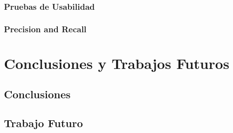 \documentclass[12pt,letterpaper,openany]{book}
\begin{document}
\subsection{Pruebas de Usabilidad}


\subsection{Precision and Recall}



\chapter{Conclusiones y Trabajos Futuros}\label{cap.conclu_trabajos}
\section{Conclusiones}
\section{Trabajo Futuro}


\end{document}
